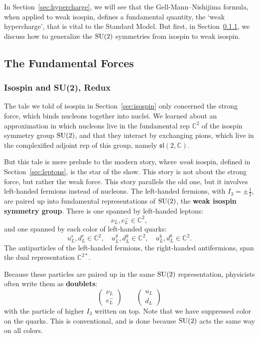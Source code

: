 \documentclass[12pt]{article}
\newcommand{\C}{{\mathbb C}}  %
\newcommand{\SU}{{\rm SU}}    %
\renewcommand{\sl}{\mathfrak{sl}} %
\newcommand{\half}{\frac{1}{2}} %
\newcommand{\lep}{\left( \! \begin{array}{c} \nu_L \\ e^-_L \end{array} \! \right)} %
\newcommand{\quark}{\left( \! \begin{array}{c} u_L \\ d_L \end{array} \! \right)} %
\begin{document}
In Section~\ref{sec:hypercharge}, we will see that the Gell-Mann--Nishijima
formula, when applied to weak isospin, defines a fundamental quantity, the
`weak hypercharge', that is vital to the Standard Model. But first, in
Section~\ref{sec:redux}, we discuss how to generalize the $\SU(2)$ symmetries
from isospin to weak isospin.

\subsection{The Fundamental Forces} \label{sec:forces}

\subsubsection{Isospin and {\rm{SU(2)}}, Redux} \label{sec:redux}

The tale we told of isospin in Section~\ref{sec:isospin} only concerned
the strong force, which binds nucleons together into nuclei. We learned
about an approximation in which nucleons live in the fundamental rep $\C^2$ 
of the isospin symmetry group $\SU(2)$, and that they interact by exchanging 
pions, which live in the complexified adjoint rep of this group,
namely $\sl(2, \C)$.

But this tale is mere prelude to the modern story, where \emph{weak} isospin, 
defined in Section~\ref{sec:leptons}, is the star of the show.  This story
is not about the strong force, but rather the weak force.   This story
parallels the old one, but it involves left-handed fermions instead of nucleons.
The left-handed fermions, with $I_3 = \pm \half$, are paired up into
fundamental representations of $\SU(2)$, the \textbf{weak isospin symmetry
group}.  There is one spanned by left-handed leptons:
\[ \nu_L, e^-_L \in \C^2, \]
and one spanned by each color of left-handed quarks:
\[ u^r_L, d^r_L \in \C^2, \quad u^g_L, d^g_L \in \C^2, \quad 
u^b_L, d^b_L \in \C^2. \]
The antiparticles of the left-handed fermions, the right-handed antifermions,
span the dual representation $\C^{2*}$.

Because these particles are paired up in the same $\SU(2)$ representation,
physicists often write them as \textbf{doublets}:
\[ \lep \qquad \quark \]
with the particle of higher $I_3$ written on top. Note that we have suppressed
color on the quarks. This is conventional, and is done because $\SU(2)$ acts
the same way on all colors.
\end{document}

